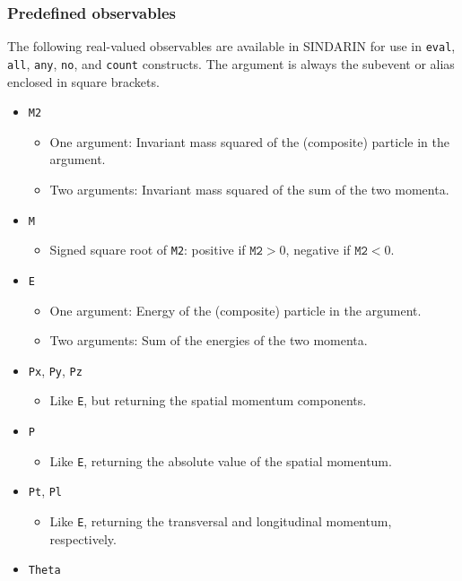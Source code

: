 \documentclass[12pt]{book}
\newcommand{\ttt}[1]{\texttt{#1}}
\begin{document}
\subsubsection{Predefined observables}

The following real-valued observables are available in SINDARIN for use in
\ttt{eval}, \ttt{all}, \ttt{any}, \ttt{no}, and \ttt{count} constructs.  The
argument is always the subevent or alias enclosed in square brackets.
\begin{itemize}
\item \ttt{M2}
  \begin{itemize}
  \item One argument: Invariant mass squared of the (composite) particle in the
    argument.
  \item Two arguments: Invariant mass squared of the sum of the two momenta.
  \end{itemize}
\item \ttt{M}
  \begin{itemize}
  \item Signed square root of \ttt{M2}: positive if $\ttt{M2}>0$, negative if
    $\ttt{M2}<0$.
  \end{itemize}
\item \ttt{E}
  \begin{itemize}
  \item One argument: Energy of the (composite) particle in the argument.
  \item Two arguments: Sum of the energies of the two momenta.
  \end{itemize}
\item \ttt{Px}, \ttt{Py}, \ttt{Pz}
  \begin{itemize}
  \item Like \ttt{E}, but returning the spatial momentum components.
  \end{itemize}
\item \ttt{P}
  \begin{itemize}
  \item Like \ttt{E}, returning the absolute value of the spatial momentum.
  \end{itemize}
\item \ttt{Pt}, \ttt{Pl}
  \begin{itemize}
  \item Like \ttt{E}, returning the transversal and longitudinal momentum,
    respectively.
  \end{itemize}
\item \ttt{Theta}
  \begin{itemize}

\end{itemize}
\end{itemize}
\end{document}

